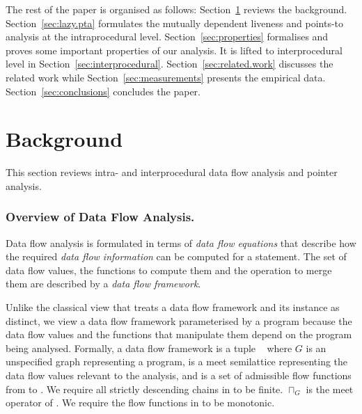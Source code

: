 \documentclass{llncs}
\begin{document}
The rest of the paper is organised as follows:
Section~\ref{sec:background} reviews the background. 
Section~\ref{sec:lazy.pta} formulates the mutually dependent
liveness and points-to analysis at the
intraprocedural level. 
Section~\ref{sec:properties}
formalises and proves some important properties of our analysis.
It is lifted to interprocedural level
in Section~\ref{sec:interprocedural}. 
Section~\ref{sec:related.work} discusses the related work while
Section~\ref{sec:measurements} presents the empirical data.
 Section~\ref{sec:conclusions} concludes the
paper.




\section{Background}
\label{sec:background}

This section reviews intra- and interprocedural data flow analysis
and pointer analysis.


\newcommand{\LD}{\text{{\bfseries\em L}$_G$}\xspace}
\newcommand{\FD}{\text{{\bfseries\em F}$\!_G$}\xspace}

\subsubsection{Overview of Data Flow Analysis.}
\label{sec:dff}
Data flow analysis is formulated in terms of {\em data flow equations\/} that
describe how the required {\em data flow information\/} can be computed for a statement.
The set of data flow values, the functions to compute them and the operation
to merge them are described by a {\em data flow framework\/}.

Unlike the classical view that treats a data flow framework and its
instance as distinct\cite{Kildall.GA:1973:unified-approach-to,Kam.JB.Ullman.JD:1977:Monotone-data-flow,Hecht.MS:1977:Flow-Analysis-of,Aho.AV.Lam.MS.Sethi.R.Ullman.JD:2006:Compilers-Principles-Techniques,Nielson.F.Nielson.HR.Hankin.C:1998:Principles-of-Program},
we view a data flow framework parameterised by a program because the
data flow values and the functions that manipulate them depend on the program being 
analysed. Formally, a data flow framework is a tuple 
\text{$\langle\LD,\sqcap_G,\FD\rangle$}~\cite{Khedker.U.Sanyal.A.Karkare.B:2009:Data-Flow-Analysis} 
where $G$ is an unspecified graph representing a program,
\LD is a meet semilattice representing the data flow values relevant to the analysis,
and \FD is a set of admissible flow functions from \LD to \LD. 
We require all strictly descending chains in \LD to be finite.
$\sqcap_G$ is the meet operator of \LD.
We require the flow functions in \FD to be monotonic.
\end{document}
